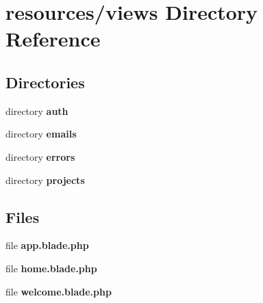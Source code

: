 \section{resources/views Directory Reference}
\label{dir_20f3ce36a9959840e63fca9d72344d7f}
\subsection*{Directories}
\begin{DoxyCompactItemize}
\item 
directory {\bf auth}
\item 
directory {\bf emails}
\item 
directory {\bf errors}
\item 
directory {\bf projects}
\end{DoxyCompactItemize}
\subsection*{Files}
\begin{DoxyCompactItemize}
\item 
file {\bf app.\+blade.\+php}
\item 
file {\bf home.\+blade.\+php}
\item 
file {\bf welcome.\+blade.\+php}
\end{DoxyCompactItemize}
